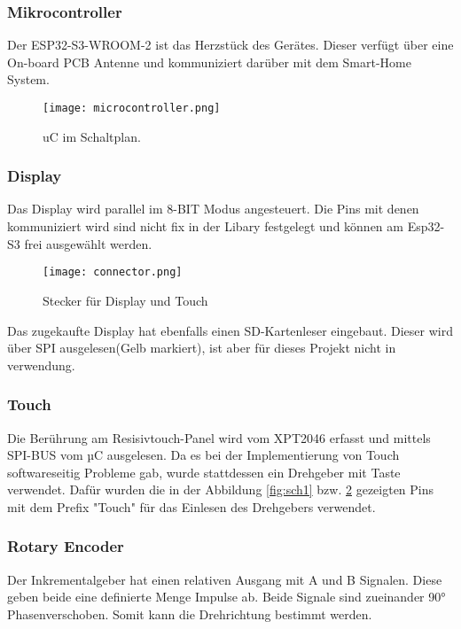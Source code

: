         \newpage

        \subsubsection{Mikrocontroller}
        Der ESP32-S3-WROOM-2 ist das Herzstück des Gerätes. Dieser verfügt über eine On-board PCB Antenne
        und kommuniziert darüber mit dem Smart-Home System. 

            \begin{figure}[h!]
                \centering
                \texttt{[image: microcontroller.png]}
                \caption{uC im Schaltplan.}
                \label{fig:sch3}

            \end{figure}

        \subsubsection{Display}
        Das Display wird parallel im 8-BIT Modus angesteuert. Die Pins mit denen 
        kommuniziert wird sind nicht fix in der Libary festgelegt und können am Esp32-S3 
        frei ausgewählt werden. 

            \begin{figure}[h!]
                \centering
                \texttt{[image: connector.png]}
                \caption{Stecker für Display und Touch}
                \label{fig:sch4}

            \end{figure}

        Das zugekaufte Display hat ebenfalls einen SD-Kartenleser eingebaut. Dieser wird 
        über SPI ausgelesen(Gelb markiert), ist aber für dieses Projekt nicht in verwendung. 


        \subsubsection{Touch}
        Die Berührung am Resisivtouch-Panel wird vom XPT2046 erfasst und mittels 
        SPI-BUS vom µC ausgelesen. Da es bei der Implementierung von Touch softwareseitig
        Probleme gab, wurde stattdessen ein Drehgeber mit Taste verwendet.
        Dafür wurden die in der Abbildung \ref{fig:sch1} bzw. \ref{fig:sch4} gezeigten Pins mit 
        dem Prefix "Touch" für das Einlesen des Drehgebers verwendet.

        \subsubsection{Rotary Encoder}
        Der Inkrementalgeber hat einen relativen Ausgang mit A und B Signalen. Diese geben beide
        eine definierte Menge Impulse ab. Beide Signale sind zueinander 90° Phasenverschoben. Somit
        kann die Drehrichtung bestimmt werden. 